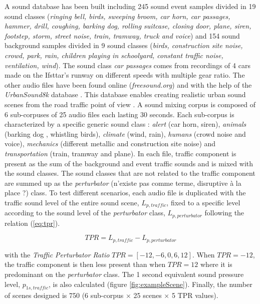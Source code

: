 \documentclass[twocolumn,a4paper,10pt]{article}
\begin{document}
A sound database has been built including 245 sound event samples divided in 19 sound classes (\textit{ringing bell, birds, sweeping broom, car horn, car passages, hammer, drill, coughing, barking dog, rolling suitcase, closing door, plane, siren, footstep, storm, street noise, train, tramway, truck and voice}) and 154 sound background samples divided in 9 sound classes (\textit{birds, construction site noise, crowd, park, rain, children playing in schoolyard, constant traffic noise, ventilation, wind}). The sound class \textit{car passages} comes from recordings of 4 cars made on the Ifsttar's runway on different speeds with multiple gear ratio. The other audio files have been found online (\textit{freesound.org}) and with the help of the \textit{UrbanSound8k} database \cite{salamon_dataset_nodate}. This database enables creating realistic urban sound scenes from the road traffic point of view \cite{gloaguen_creation_2017}. A sound mixing corpus is composed of 6 sub-corpuses of 25 audio files each lasting 30 seconds. Each sub-corpus is characterized by a specific generic sound class : \textit{alert} (car horn, siren), \textit{animals} (barking dog , whistling birds), \textit{climate} (wind, rain), \textit{humans} (crowd noise and voice), \textit{mechanics} (different metallic and construction site noise) and \textit{transportation} (train, tramway and plane). In each file, traffic component is present as the sum of the background and event traffic sounds and is mixed with the sound classes. The sound classes that are not related to the traffic component are summed up as the \textit{perturbator} (n'existe pas comme terme, disruptive à la place ?) class. To test different scenarios, each audio file is duplicated with the traffic sound level of the entire sound scene, $L_{p,traffic}$, fixed to a specific level according to the sound level of the \textit{perturbator} class, $L_{p,perturbator}$ following the relation (\ref{eq:tpr}). 

\begin{equation}\label{eq:tpr}
TPR = L_{p,traffic}-L_{p,perturbator}
\end{equation}

with the \textit{Traffic Perturbator Ratio} $TPR = \left[-12, -6, 0, 6, 12\right]$. When $TPR = -12$, the traffic component is then less present than when $TPR = 12$ where it is predominant on the \textit{perturbator} class. The 1 second equivalent sound pressure level, $p_{1s,traffic}$, is also calculated (figure \ref{fig:exampleScene}). Finally, the number of scenes designed is 750 (6 sub-corpus $\times$ 25 scenes $\times$  5 TPR values). 
\end{document}
